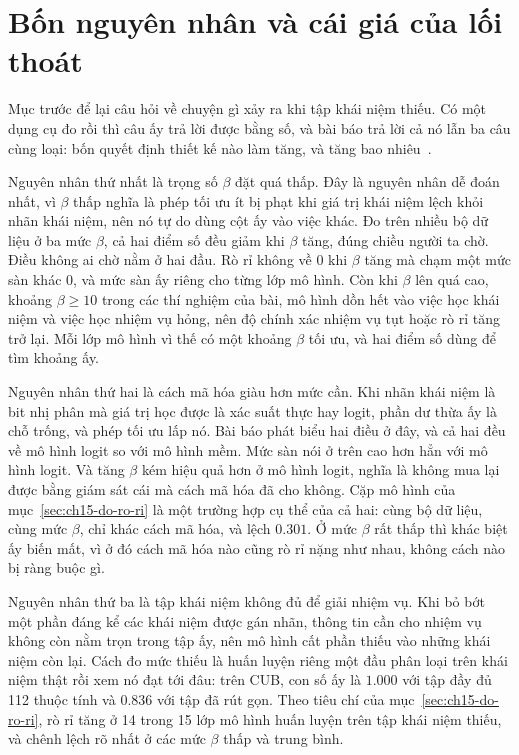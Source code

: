 \section{Bốn nguyên nhân và cái giá của lối thoát}
\label{sec:ch15-nguyen-nhan}

%
Mục trước để lại câu hỏi về chuyện gì xảy ra khi tập khái niệm thiếu. Có một
dụng cụ đo rồi thì câu ấy trả lời được bằng số, và bài báo trả lời cả nó lẫn ba
câu cùng loại: bốn quyết định thiết kế nào làm  tăng, và tăng
bao nhiêu~\autocite{p30leakage}.

%
Nguyên nhân thứ nhất là trọng số $\beta$ đặt quá thấp. Đây là nguyên nhân dễ
đoán nhất, vì $\beta$ thấp nghĩa là phép tối ưu ít bị phạt khi giá trị khái niệm
lệch khỏi nhãn khái niệm, nên nó tự do dùng cột ấy vào việc khác. Đo trên nhiều
bộ dữ liệu ở ba mức $\beta$, cả hai điểm số đều giảm khi $\beta$ tăng, đúng chiều
người ta chờ. Điều không ai chờ nằm ở hai đầu. Rò rỉ không về 0 khi $\beta$ tăng
mà chạm một mức sàn khác 0, và mức sàn ấy riêng cho từng lớp mô hình. Còn khi
$\beta$ lên quá cao, khoảng $\beta \ge 10$ trong các thí nghiệm của bài, mô hình
dồn hết vào việc học khái niệm và việc học nhiệm vụ hỏng, nên độ chính xác nhiệm
vụ tụt hoặc rò rỉ tăng trở lại. Mỗi lớp mô hình vì thế có một khoảng $\beta$ tối
ưu, và hai điểm số dùng để tìm khoảng ấy.

%
Nguyên nhân thứ hai là cách mã hóa giàu hơn mức cần. Khi nhãn khái niệm là bit
nhị phân mà giá trị học được là xác suất thực hay logit, phần dư thừa ấy là chỗ
trống, và phép tối ưu lấp nó. Bài báo phát biểu hai điều ở đây, và cả hai đều về
mô hình logit so với mô hình mềm. Mức sàn nói ở trên cao hơn hẳn với mô hình
logit. Và tăng $\beta$ kém hiệu quả hơn ở mô hình logit, nghĩa là không mua lại
được bằng giám sát cái mà cách mã hóa đã cho không. Cặp mô hình của
mục~\ref{sec:ch15-do-ro-ri} là một trường hợp cụ thể của cả hai: cùng bộ dữ
liệu, cùng mức $\beta$, chỉ khác cách mã hóa, và
 lệch $0.301$.
Ở mức $\beta$ rất thấp thì khác biệt ấy biến mất, vì ở đó cách mã hóa nào cũng
rò rỉ nặng như nhau, không cách nào bị ràng buộc gì.

%
Nguyên nhân thứ ba là tập khái niệm không đủ để giải nhiệm vụ. Khi bỏ bớt một
phần đáng kể các khái niệm được gán nhãn, thông tin cần cho nhiệm vụ không còn
nằm trọn trong tập ấy, nên mô hình cất phần thiếu vào những khái niệm còn lại.
Cách đo mức thiếu là huấn luyện riêng một đầu phân loại trên khái niệm thật rồi
xem nó đạt tới đâu: trên CUB, con số ấy là $1.000$ với tập đầy đủ 112 thuộc tính
và $0.836$ với tập đã rút gọn. Theo tiêu chí của
mục~\ref{sec:ch15-do-ro-ri}, rò rỉ tăng ở 14 trong 15 lớp mô hình huấn luyện
trên tập khái niệm thiếu, và chênh lệch rõ nhất ở các mức $\beta$ thấp và trung
bình.

